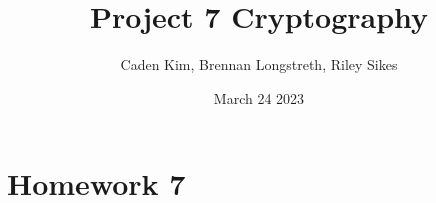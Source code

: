 \documentclass{article}
\title{Project 7 Cryptography}
\author{Caden Kim, Brennan Longstreth, Riley Sikes }
\date{March 24 2023}
\begin{document}
\maketitle

\section{Homework 7}

\end{document}
